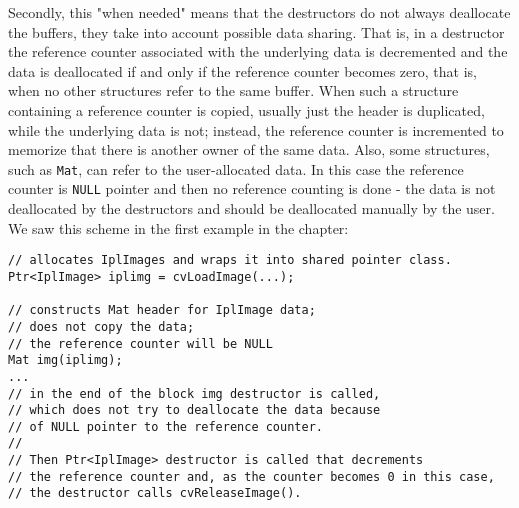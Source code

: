 Secondly, this "when needed" means that the destructors do not always deallocate the buffers, they take into account possible data sharing.
That is, in a destructor the reference counter associated with the underlying data is decremented and the data is deallocated
if and only if the reference counter becomes zero, that is, when no other structures refer to the same buffer. When such a structure
containing a reference counter is copied, usually just the header is duplicated, while the underlying data is not; instead, the reference counter is incremented to memorize that there is another owner of the same data.
Also, some structures, such as \texttt{Mat}, can refer to the user-allocated data.
In this case the reference counter is \texttt{NULL} pointer and then no reference counting is done - the data is not deallocated by the destructors and should be deallocated manually by the user. We saw this scheme in the first example in the chapter:
\begin{lstlisting}
// allocates IplImages and wraps it into shared pointer class.
Ptr<IplImage> iplimg = cvLoadImage(...);

// constructs Mat header for IplImage data;
// does not copy the data;
// the reference counter will be NULL
Mat img(iplimg);
...
// in the end of the block img destructor is called,
// which does not try to deallocate the data because
// of NULL pointer to the reference counter.
//
// Then Ptr<IplImage> destructor is called that decrements
// the reference counter and, as the counter becomes 0 in this case,
// the destructor calls cvReleaseImage().
\end{lstlisting}


